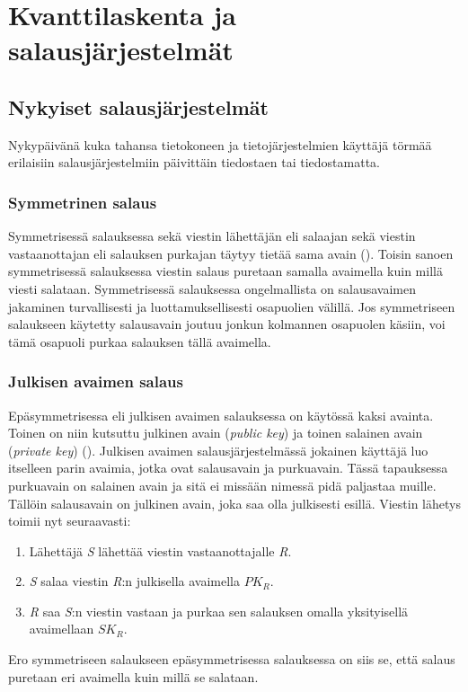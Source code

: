 \chapter{Kvanttilaskenta ja salausjärjestelmät\label{methods}}

\section{Nykyiset salausjärjestelmät}

Nykypäivänä kuka tahansa tietokoneen ja tietojärjestelmien käyttäjä törmää erilaisiin salausjärjestelmiin päivittäin tiedostaen tai tiedostamatta.

\subsection{Symmetrinen salaus}
 Symmetrisessä salauksessa sekä viestin lähettäjän eli salaajan sekä viestin vastaanottajan eli salauksen purkajan täytyy tietää sama avain (\cite{bellare2005introduction}). Toisin sanoen symmetrisessä salauksessa viestin salaus puretaan samalla avaimella kuin millä viesti salataan.  Symmetrisessä salauksessa ongelmallista on salausavaimen jakaminen turvallisesti ja luottamuksellisesti osapuolien välillä. Jos symmetriseen salaukseen käytetty salausavain joutuu jonkun kolmannen osapuolen käsiin, voi tämä osapuoli purkaa salauksen tällä avaimella.
 
 
 
 \subsection{Julkisen avaimen salaus}
 Epäsymmetrisessa eli julkisen avaimen salauksessa on käytössä kaksi avainta. Toinen on niin kutsuttu julkinen avain (\emph{public key}) ja toinen salainen avain (\emph{private key}) (\cite{bellare2005introduction}). Julkisen avaimen salausjärjestelmässä jokainen käyttäjä luo itselleen parin avaimia, jotka ovat salausavain ja purkuavain. Tässä tapauksessa purkuavain on salainen avain ja sitä ei missään nimessä pidä paljastaa muille. Tällöin salausavain on julkinen avain, joka saa olla julkisesti esillä. Viestin lähetys toimii nyt seuraavasti:
 
 \begin{enumerate}
     \item Lähettäjä \emph{S} lähettää viestin vastaanottajalle \emph{R}.
     \item \emph{S} salaa viestin \emph{R}:n julkisella avaimella $PK_{R}$.
     \item \emph{R} saa \emph{S}:n viestin vastaan ja purkaa sen salauksen omalla yksityisellä avaimellaan $SK_{R}$.
 \end{enumerate}
Ero symmetriseen salaukseen epäsymmetrisessa salauksessa on siis se, että salaus puretaan eri avaimella kuin millä se salataan.
 
